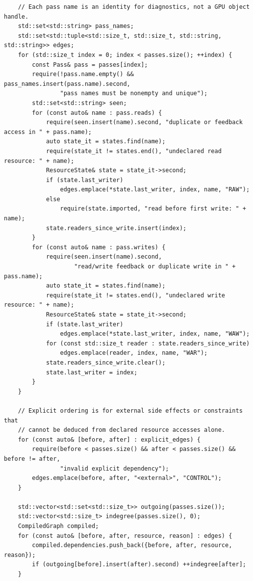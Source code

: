 \begin{verbatim}
    // Each pass name is an identity for diagnostics, not a GPU object handle.
    std::set<std::string> pass_names;
    std::set<std::tuple<std::size_t, std::size_t, std::string, std::string>> edges;
    for (std::size_t index = 0; index < passes.size(); ++index) {
        const Pass& pass = passes[index];
        require(!pass.name.empty() && pass_names.insert(pass.name).second,
                "pass names must be nonempty and unique");
        std::set<std::string> seen;
        for (const auto& name : pass.reads) {
            require(seen.insert(name).second, "duplicate or feedback access in " + pass.name);
            auto state_it = states.find(name);
            require(state_it != states.end(), "undeclared read resource: " + name);
            ResourceState& state = state_it->second;
            if (state.last_writer)
                edges.emplace(*state.last_writer, index, name, "RAW");
            else
                require(state.imported, "read before first write: " + name);
            state.readers_since_write.insert(index);
        }
        for (const auto& name : pass.writes) {
            require(seen.insert(name).second,
                    "read/write feedback or duplicate write in " + pass.name);
            auto state_it = states.find(name);
            require(state_it != states.end(), "undeclared write resource: " + name);
            ResourceState& state = state_it->second;
            if (state.last_writer)
                edges.emplace(*state.last_writer, index, name, "WAW");
            for (const std::size_t reader : state.readers_since_write)
                edges.emplace(reader, index, name, "WAR");
            state.readers_since_write.clear();
            state.last_writer = index;
        }
    }

    // Explicit ordering is for external side effects or constraints that
    // cannot be deduced from declared resource accesses alone.
    for (const auto& [before, after] : explicit_edges) {
        require(before < passes.size() && after < passes.size() && before != after,
                "invalid explicit dependency");
        edges.emplace(before, after, "<external>", "CONTROL");
    }

    std::vector<std::set<std::size_t>> outgoing(passes.size());
    std::vector<std::size_t> indegree(passes.size(), 0);
    CompiledGraph compiled;
    for (const auto& [before, after, resource, reason] : edges) {
        compiled.dependencies.push_back({before, after, resource, reason});
        if (outgoing[before].insert(after).second) ++indegree[after];
    }


\end{verbatim}
